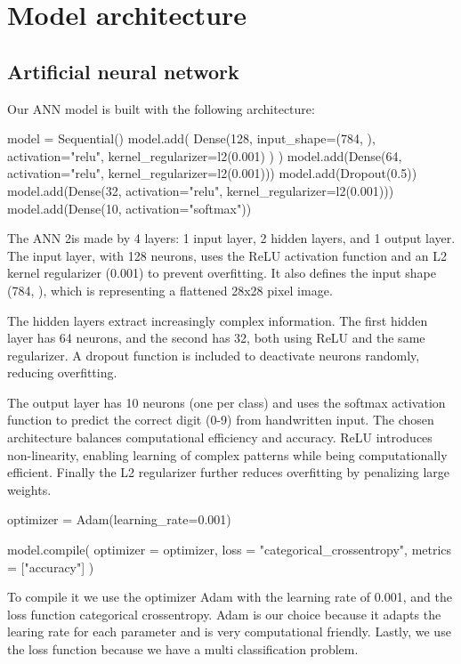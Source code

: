 \section{Model architecture}

\subsection{Artificial neural network}
Our ANN model is built with the following architecture:
\begin{python}
model = Sequential()
model.add( 
         Dense(128, 
               input_shape=(784, ),
               activation="relu", 
               kernel_regularizer=l2(0.001)
               )
          )
model.add(Dense(64, activation="relu", kernel_regularizer=l2(0.001)))
model.add(Dropout(0.5))
model.add(Dense(32, activation="relu", kernel_regularizer=l2(0.001)))
model.add(Dense(10, activation="softmax"))
\end{python}
The ANN 2is made by 4 layers: 1 input layer, 2 hidden layers, and 1 output layer. 
The input layer, with 128 neurons, uses the ReLU activation function and an L2 kernel regularizer (0.001) to prevent overfitting.
It also defines the input shape (784, ), which is representing a flattened 28x28 pixel image.
\par
The hidden layers extract increasingly complex information. 
The first hidden layer has 64 neurons, and the second has 32, both using ReLU and the same regularizer. 
A dropout function is included to deactivate neurons randomly, reducing overfitting.
\par
The output layer has 10 neurons (one per class) and uses the softmax activation function to predict the correct digit (0-9) from handwritten input.
The chosen architecture balances computational efficiency and accuracy. ReLU introduces non-linearity, enabling learning of complex patterns while being computationally efficient. 
Finally the L2 regularizer further reduces overfitting by penalizing large weights.

\begin{python}
optimizer = Adam(learning_rate=0.001)

model.compile(
    optimizer = optimizer, 
    loss = "categorical_crossentropy", 
    metrics = ["accuracy"]
)
\end{python}
To compile it we use the optimizer Adam with the learning rate of 0.001, and the loss function categorical crossentropy.
Adam is our choice because it adapts the learing rate for each parameter and is very computational friendly.
Lastly, we use the loss function because we have a multi classification problem.

